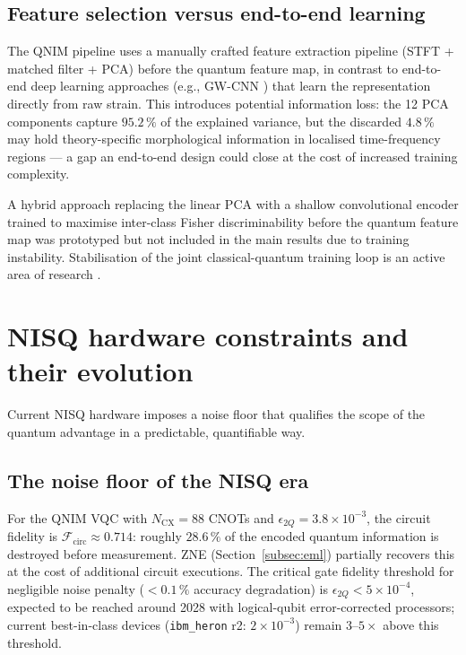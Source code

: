 \documentclass[11pt,a4paper, english]{book}
\theoremstyle{plain}
\theoremstyle{definition}
\numberwithin{equation}{chapter}
\numberwithin{figure}{chapter}
\numberwithin{table}{chapter}
\begin{document}
\subsection{Feature selection versus end-to-end learning}
\label{subsec:disc-feature-selection}

The QNIM pipeline uses a manually crafted feature extraction pipeline
(STFT + matched filter + PCA) before the quantum feature map, in
contrast to end-to-end deep learning approaches (e.g., GW-CNN
\cite{George_2018}) that learn the representation directly from raw
strain. This introduces potential information loss: the 12 PCA
components capture $95.2\,\%$ of the explained variance, but the
discarded $4.8\,\%$ may hold theory-specific morphological information
in localised time-frequency regions --- a gap an end-to-end design
could close at the cost of increased training complexity.

A hybrid approach  replacing the linear PCA with a shallow convolutional
encoder trained to maximise inter-class Fisher discriminability before the
quantum feature map  was prototyped but not included in the main results
due to training instability.  Stabilisation of the joint classical-quantum
training loop is an active area of research \cite{Mari_2020_quantum_classical}.

\section{NISQ hardware constraints and their evolution}
\label{sec:disc-nisq}

Current NISQ hardware imposes a noise floor that qualifies the scope of
the quantum advantage in a predictable, quantifiable way.

\subsection{The noise floor of the NISQ era}
\label{subsec:disc-noise-floor}

For the QNIM VQC with $N_\mathrm{CX} = 88$ CNOTs and
$\epsilon_{2Q} = 3.8\times10^{-3}$, the circuit fidelity is
$\mathcal{F}_\mathrm{circ} \approx 0.714$: roughly $28.6\,\%$ of the
encoded quantum information is destroyed before measurement. ZNE
(Section~\ref{subsec:eml}) partially recovers this at the cost of
additional circuit executions. The critical gate fidelity threshold for
negligible noise penalty ($< 0.1\,\%$ accuracy degradation) is
$\epsilon_{2Q} < 5\times10^{-4}$, expected to be reached around 2028
with logical-qubit error-corrected processors; current best-in-class
devices (\texttt{ibm\_heron} r2: $2\times10^{-3}$) remain $3$--$5\times$
above this threshold.
\end{document}
